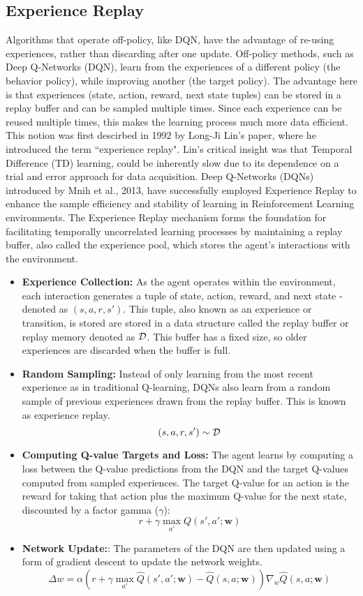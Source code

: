 \subsection{Experience Replay}
Algorithms that operate off-policy, like DQN, have the advantage of re-using experiences, rather than discarding after one update. 
Off-policy methods, such as Deep Q-Networks (DQN), learn from the experiences of a different policy (the behavior policy), while improving another (the target policy). The advantage here is that experiences (state, action, reward, next state tuples) can be stored in a replay buffer and can be sampled multiple times.
Since each experience can be reused multiple times, this makes the learning process much more data efficient.
This notion was first descirbed in 1992 by Long-Ji Lin's paper, where he introduced the term ``experience replay". Lin's critical insight was that Temporal Difference (TD) learning, could be inherently slow due to its dependence on a trial and error approach for data acquisition.
Deep Q-Networks (DQNs) introduced by Mnih et al., 2013, have successfully employed Experience Replay to enhance the sample efficiency and stability of learning in Reinforcement Learning environments. The Experience Replay mechanism forms the foundation for facilitating temporally uncorrelated learning processes by maintaining a replay buffer, also called the experience pool, which stores the agent's interactions with the environment.
\begin{itemize}
    \item \textbf{Experience Collection:} As the agent operates within the environment, each interaction generates a tuple of state, action, reward, and next state - denoted as $(s, a, r, s')$. This tuple, also known as an experience or transition, is stored are stored in a data structure called the replay buffer or replay memory denoted as $\mathcal D$. This buffer has a fixed size, so older experiences are discarded when the buffer is full.
    
    \item \textbf{Random Sampling:}  Instead of only learning from the most recent experience as in traditional Q-learning, DQNs also learn from a random sample of previous experiences drawn from the replay buffer. This is known as experience replay.
    $$
    (s,a,r,s') \sim \mathcal D
    $$
    \item \textbf{Computing Q-value Targets and Loss:} The agent learns by computing a loss between the Q-value predictions from the DQN and the target Q-values computed from sampled experiences. The target Q-value for an action is the reward for taking that action plus the maximum Q-value for the next state, discounted by a factor gamma ($\gamma$):
    $$
    r + \gamma \max_{a'}  Q(s',a';\boldsymbol{w})
    $$
    \item \textbf{Network Update:}: The parameters of the DQN are then updated using a form of gradient descent to update the network weights.
    $$
    \Delta w = \alpha \left( r + \gamma \max_{a'} \hat{Q}(s', a'; \boldsymbol{w}) - \hat{Q}(s, a; \boldsymbol{w}) \right) \nabla_w \hat{Q}(s, a;\boldsymbol{w})
    $$
\end{itemize}

